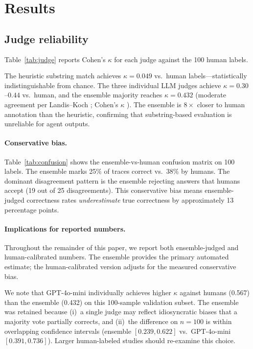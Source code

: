 \documentclass[preprint,review,12pt,3p]{elsarticle}
\begin{document}
\section{Results}
\label{sec:results}

\subsection{Judge reliability}
\label{sec:judge}

Table~\ref{tab:judge} reports Cohen's $\kappa$ for each judge against
the 100 human labels.

The heuristic substring match achieves $\kappa{=}0.049$ vs.\ human
labels---statistically indistinguishable from chance.
The three individual LLM judges achieve $\kappa{=}0.30$--$0.44$ vs.\
human, and the ensemble majority reaches $\kappa{=}0.432$ (moderate
agreement per Landis--Koch \citep{landis1977kappa};
Cohen's $\kappa$ \citep{cohen1960kappa}).
The ensemble is $8{\times}$ closer to human annotation than the
heuristic, confirming that substring-based evaluation is unreliable
for agent outputs.



\paragraph{Conservative bias.}
Table~\ref{tab:confusion} shows the ensemble-vs-human confusion matrix
on 100 labels.
The ensemble marks 25\% of traces correct vs.\ 38\% by humans.
The dominant disagreement pattern is the ensemble rejecting answers that
humans accept (19 out of 25 disagreements).
This conservative bias means ensemble-judged correctness rates
\emph{underestimate} true correctness by approximately 13 percentage
points.



\paragraph{Implications for reported numbers.}
Throughout the remainder of this paper, we report both ensemble-judged
and human-calibrated numbers.
The ensemble provides the primary automated estimate; the
human-calibrated version adjusts for the measured conservative bias.

We note that GPT-4o-mini individually achieves higher $\kappa$ against
humans (0.567) than the ensemble (0.432) on this 100-sample validation
subset.
The ensemble was retained because (i)~a single judge may reflect
idiosyncratic biases that a majority vote partially corrects, and
(ii)~the difference on $n{=}100$ is within overlapping confidence
intervals (ensemble $[0.239, 0.622]$ vs.\ GPT-4o-mini
$[0.391, 0.736]$).
Larger human-labeled studies should re-examine this choice.
\end{document}
